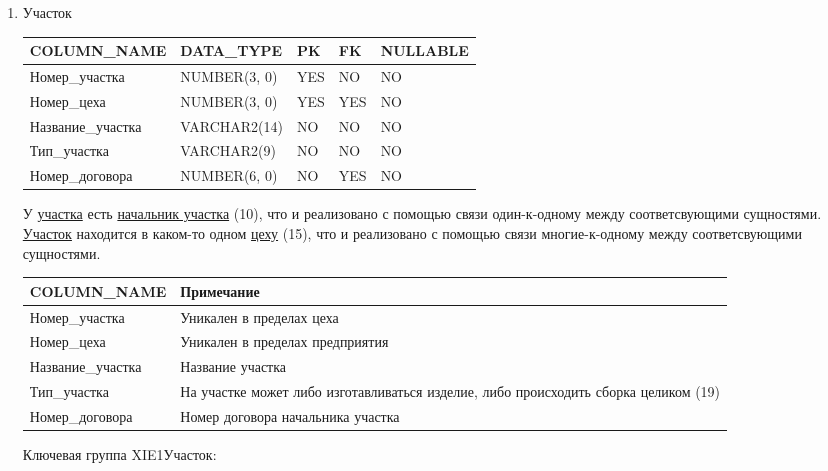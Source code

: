 \begin{enumerate}
\begin{tabular}{|p{4cm}|p{5cm}|}
    \end{tabular}

    \item{Участок}

    \begin{tabular}{|p{4cm}|p{3cm}|p{1cm}|p{1cm}|p{2cm}|} \hline

        {\bf COLUMN\_NAME} & {\bf DATA\_TYPE} & {\bf PK} & {\bf FK} & {\bf NULLABLE} \\ \hline
        Номер\_участка & NUMBER(3, 0) & YES & NO & NO \\ \hline
        Номер\_цеха & NUMBER(3, 0) & YES & YES & NO \\ \hline
        Название\_участка & VARCHAR2(14) & NO & NO & NO \\ \hline
        Тип\_участка & VARCHAR2(9) & NO & NO & NO \\ \hline
        Номер\_договора & NUMBER(6, 0) & NO & YES & NO \\ \hline

    \end{tabular}

    У \underline{участка} есть \underline{начальник участка} (10), что и реализовано с помощью связи один-к-одному между соответсвующими сущностями.
    \underline{Участок} находится в каком-то одном \underline{цеху} (15), что и реализовано с помощью связи многие-к-одному между соответсвующими сущностями.

    \begin{tabular}{|p{4cm}|p{5cm}|} \hline

        {\bf COLUMN\_NAME} & {\bf Примечание} \\ \hline
        Номер\_участка & Уникален в пределах цеха \\ \hline
        Номер\_цеха & Уникален в пределах предприятия \\ \hline
        Название\_участка & Название участка \\ \hline
        Тип\_участка &  На участке может либо изготавливаться изделие, либо происходить сборка целиком (19) \\ \hline
        Номер\_договора & Номер договора начальника участка \\ \hline

    \end{tabular}

    Ключевая группа XIE1Участок:

    \begin{tabular}{|p{4cm}|p{5cm}|} \hline


\end{tabular}
\end{enumerate}
